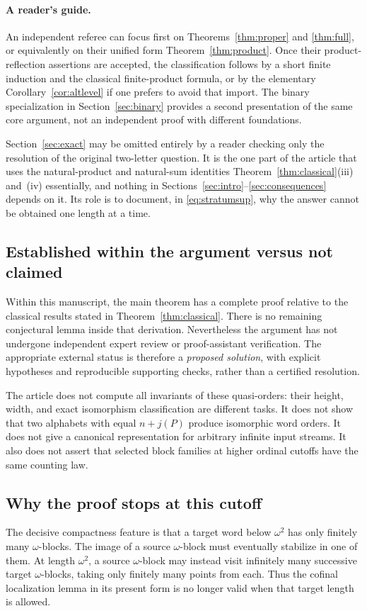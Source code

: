 \documentclass[11pt,a4paper]{article}
\numberwithin{equation}{section}
\theoremstyle{definition}
\theoremstyle{remark}
\begin{document}
\paragraph{A reader's guide.}
An independent referee can focus first on Theorems~\ref{thm:proper} and
\ref{thm:full}, or equivalently on their unified form
Theorem~\ref{thm:product}. Once their product-reflection assertions are
accepted, the classification follows by a short finite induction and the
classical finite-product formula, or by the elementary
Corollary~\ref{cor:altlevel} if one prefers to avoid that import. The binary
specialization in Section~\ref{sec:binary} provides a second presentation of
the same core argument, not an independent proof with different foundations.

Section~\ref{sec:exact} may be omitted entirely by a reader checking only the
resolution of the original two-letter question. It is the one part of the
article that uses the natural-product and natural-sum identities
Theorem~\ref{thm:classical}(iii) and~(iv) essentially, and nothing in
Sections~\ref{sec:intro}--\ref{sec:consequences} depends on it. Its role is to
document, in \eqref{eq:stratumsup}, why the answer cannot be obtained one
length at a time.

\subsection{Established within the argument versus not claimed}
Within this manuscript, the main theorem has a complete proof relative to
the classical results stated in Theorem~\ref{thm:classical}. There is no
remaining conjectural lemma inside that derivation. Nevertheless the
argument has not undergone independent expert review or proof-assistant
verification. The appropriate external status is therefore a
\emph{proposed solution}, with explicit hypotheses and reproducible
supporting checks, rather than a certified resolution.

The article does not compute all invariants of these quasi-orders: their
height, width, and exact isomorphism classification are different tasks.
It does not show that two alphabets with equal $n+j(P)$ produce isomorphic
word orders. It does not give a canonical representation for arbitrary
infinite input streams. It also does not assert that selected block
families at higher ordinal cutoffs have the same counting law.

\subsection{Why the proof stops at this cutoff}
The decisive compactness feature is that a target word below $\omega^2$
has only finitely many $\omega$-blocks. The image of a source $\omega$-block
must eventually stabilize in one of them. At length $\omega^2$, a source
$\omega$-block may instead visit infinitely many successive target
$\omega$-blocks, taking only finitely many points from each. Thus the
cofinal localization lemma in its present form is no longer valid when
that target length is allowed.
\end{document}
